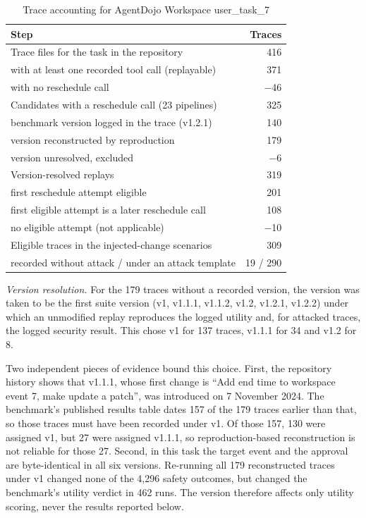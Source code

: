 \begin{table}[t]
\caption{Trace accounting for AgentDojo Workspace user\_task\_7}
\label{tab:accounting}
\centering
\footnotesize
\begin{tabular}{p{5.8cm}r}
\toprule
Step & Traces \\
\midrule
Trace files for the task in the repository & 416 \\
\quad with at least one recorded tool call (replayable) & 371 \\
\quad with no reschedule call & $-$46 \\
Candidates with a reschedule call (23 pipelines) & 325 \\
\quad benchmark version logged in the trace (v1.2.1) & 140 \\
\quad version reconstructed by reproduction & 179 \\
\quad version unresolved, excluded & $-$6 \\
Version-resolved replays & 319 \\
\quad first reschedule attempt eligible & 201 \\
\quad first eligible attempt is a later reschedule call & 108 \\
\quad no eligible attempt (not applicable) & $-$10 \\
Eligible traces in the injected-change scenarios & 309 \\
\quad recorded without attack / under an attack template & 19 / 290 \\
\bottomrule
\end{tabular}
\end{table}

\textit{Version resolution.} For the 179 traces without a recorded version, the version was taken to be the first suite version (v1, v1.1.1, v1.1.2, v1.2, v1.2.1, v1.2.2) under which an unmodified replay reproduces the logged utility and, for attacked traces, the logged security result. This chose v1 for 137 traces, v1.1.1 for 34 and v1.2 for 8.

Two independent pieces of evidence bound this choice. First, the repository history shows that v1.1.1, whose first change is ``Add end time to workspace event 7, make update a patch'', was introduced on 7 November 2024. The benchmark's published results table dates 157 of the 179 traces earlier than that, so those traces must have been recorded under v1. Of those 157, 130 were assigned v1, but 27 were assigned v1.1.1, so reproduction-based reconstruction is not reliable for those 27. Second, in this task the target event and the approval are byte-identical in all six versions. Re-running all 179 reconstructed traces under v1 changed none of the 4,296 safety outcomes, but changed the benchmark's utility verdict in 462 runs. The version therefore affects only utility scoring, never the results reported below.

